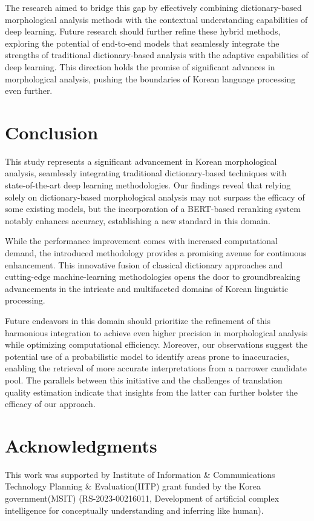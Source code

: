 \documentclass[AMS,STIX2COL]{WileyNJD-v2}
\begin{document}
    The research aimed to bridge this gap by effectively combining dictionary-based morphological analysis methods with the contextual understanding capabilities of deep learning.
    Future research should further refine these hybrid methods, exploring the potential of end-to-end models that seamlessly integrate the strengths of traditional dictionary-based analysis with the adaptive capabilities of deep learning.
    This direction holds the promise of significant advances in morphological analysis, pushing the boundaries of Korean language processing even further.


    \section{Conclusion}\label{sec:conclusion}

    This study represents a significant advancement in Korean morphological analysis, seamlessly integrating traditional dictionary-based techniques with state-of-the-art deep learning methodologies.
    Our findings reveal that relying solely on dictionary-based morphological analysis may not surpass the efficacy of some existing models, but the incorporation of a BERT-based reranking system notably enhances accuracy, establishing a new standard in this domain.

    While the performance improvement comes with increased computational demand, the introduced methodology provides a promising avenue for continuous enhancement.
    This innovative fusion of classical dictionary approaches and cutting-edge machine-learning methodologies opens the door to groundbreaking advancements in the intricate and multifaceted domains of Korean linguistic processing.

    Future endeavors in this domain should prioritize the refinement of this harmonious integration to achieve even higher precision in morphological analysis while optimizing computational efficiency.
    Moreover, our observations suggest the potential use of a probabilistic model to identify areas prone to inaccuracies, enabling the retrieval of more accurate interpretations from a narrower candidate pool.
    The parallels between this initiative and the challenges of translation quality estimation indicate that insights from the latter can further bolster the efficacy of our approach.


    \section*{Acknowledgments}
    This work was supported by Institute of Information \& Communications Technology Planning \& Evaluation(IITP) grant funded by the Korea government(MSIT) (RS-2023-00216011, Development of artificial complex intelligence for conceptually understanding and inferring like human).
\end{document}
